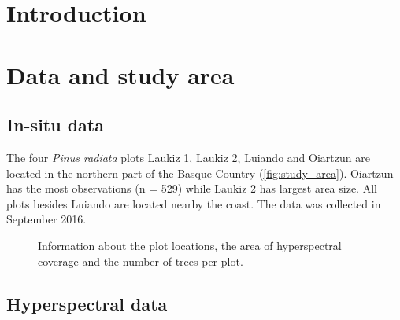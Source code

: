 \documentclass[review]{elsarticle}
\begin{document}
\section{Introduction}
\label{sec:intro}

\section{Data and study area}

\subsection{In-situ data}

The four \textit{Pinus radiata} plots Laukiz 1, Laukiz 2, Luiando and Oiartzun are located in the northern part of the Basque Country (\autoref{fig:study_area}).
Oiartzun has the most observations (n = 529) while Laukiz 2 has largest area size.
All plots besides Luiando are located nearby the coast.
The data was collected in September 2016.

\begin{figure} [t!]
	\begin{center}
		\caption{Information about the plot locations, the area of hyperspectral coverage and the number of trees per plot.}
		\label{fig:study_area}
	\end{center}
\end{figure}

\subsection{Hyperspectral data}
\end{document}
